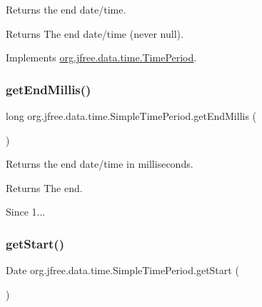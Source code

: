Returns the end date/time.

\begin{DoxyReturn}{Returns}
The end date/time (never {\ttfamily null}). 
\end{DoxyReturn}


Implements \mbox{\hyperlink{interfaceorg_1_1jfree_1_1data_1_1time_1_1_time_period_aa0fe39753e3af6252b98f5ff9f534f51}{org.\+jfree.\+data.\+time.\+Time\+Period}}.

\mbox{\label{classorg_1_1jfree_1_1data_1_1time_1_1_simple_time_period_a737d71745c5a0b48f92c4ed025a42551}} 
\subsubsection{\texorpdfstring{get\+End\+Millis()}{getEndMillis()}}
{\footnotesize\ttfamily long org.\+jfree.\+data.\+time.\+Simple\+Time\+Period.\+get\+End\+Millis (\begin{DoxyParamCaption}{ }\end{DoxyParamCaption})}

Returns the end date/time in milliseconds.

\begin{DoxyReturn}{Returns}
The end.
\end{DoxyReturn}
\begin{DoxySince}{Since}
1... 
\end{DoxySince}
\mbox{\label{classorg_1_1jfree_1_1data_1_1time_1_1_simple_time_period_aad32b7d42e1b0da520b2101321601142}} 
\subsubsection{\texorpdfstring{get\+Start()}{getStart()}}
{\footnotesize\ttfamily Date org.\+jfree.\+data.\+time.\+Simple\+Time\+Period.\+get\+Start (\begin{DoxyParamCaption}{ }\end{DoxyParamCaption})}

